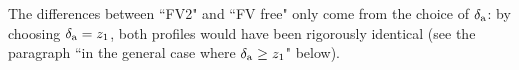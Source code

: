 The differences between ``FV2" and ``FV free" only come from the
choice of $\delta_{\rm a}$:
by choosing $\delta_{\rm a}=z_1$, both profiles would have been
rigorously identical
(see the paragraph ``in the general case where
$\delta_{\rm a} \geq z_1$" below).
